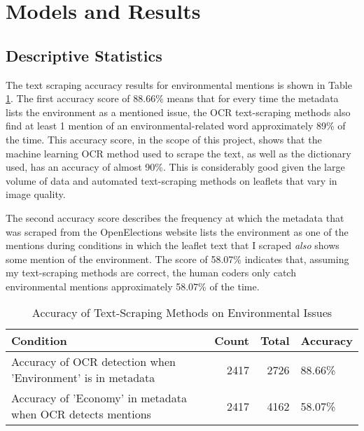 \documentclass[12pt,letterpaper]{article}
\begin{document}
\newpage

\section{Models and Results}


\subsection{Descriptive Statistics}


The text scraping accuracy results for environmental mentions is shown in Table~ \ref{tab:envaccuracy}. The first accuracy score of 88.66\% means that for every time the metadata lists the environment as a mentioned issue, the OCR text-scraping methods also find at least 1 mention of an environmental-related word approximately 89\% of the time. This accuracy score, in the scope of this project, shows that the machine learning OCR method used to scrape the text, as well as the dictionary used, has an accuracy of almost 90\%. This is considerably good given the large volume of data and automated text-scraping methods on leaflets that vary in image quality.

The second accuracy score describes the frequency at which the metadata that was scraped from the OpenElections website lists the environment as one of the mentions during conditions in which the leaflet text that I scraped \textit{also} shows some mention of the environment. The score of 58.07\% indicates that, assuming my text-scraping methods are correct, the human coders only catch environmental mentions approximately 58.07\% of the time. 




\vspace{0.5cm}


\begin{table}[!htbp] 
	\centering 
	\captionsetup{justification=centering} %
	\caption{Accuracy of Text-Scraping Methods on Environmental Issues} 
	\label{tab:envaccuracy} 
	\begin{tabular}{lrrl}
		\toprule
		Condition & Count & Total & Accuracy \\
		\midrule
		Accuracy of OCR detection when 'Environment' is in metadata & 2417 & 2726 & 88.66\% \\
		Accuracy of 'Economy' in metadata when OCR detects mentions & 2417 & 4162 & 58.07\% \\
		\bottomrule
	\end{tabular}\\
\end{table}
\end{document}
